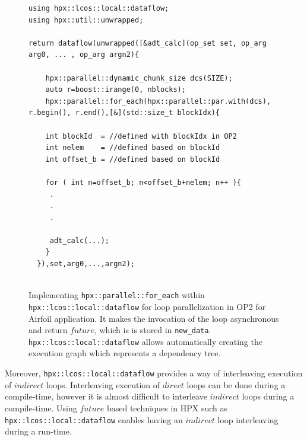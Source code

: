 \documentclass[conference]{IEEEtran}
\begin{document}
\begin{figure}
    \begin{lstlisting}    
using hpx::lcos::local::dataflow;
using hpx::util::unwrapped;    

return dataflow(unwrapped([&adt_calc](op_set set, op_arg arg0, ... , op_arg argn2){

    hpx::parallel::dynamic_chunk_size dcs(SIZE);
    auto r=boost::irange(0, nblocks);
    hpx::parallel::for_each(hpx::parallel::par.with(dcs), r.begin(), r.end(),[&](std::size_t blockIdx){
  
    int blockId  = //defined with blockIdx in OP2
    int nelem    = //defined based on blockId 
    int offset_b = //defined based on blockId
        
    for ( int n=offset_b; n<offset_b+nelem; n++ ){
     .
     .
     .

     adt_calc(...);
    }
  }),set,arg0,...,argn2);
  
    \end{lstlisting}
    \caption{\small{Implementing \texttt{hpx::parallel::for\_each} within \texttt{hpx::lcos::local::dataflow} for loop parallelization in OP2 for Airfoil application. It makes the invocation of the loop asynchronous and return $future$, which is is stored in \texttt{new\_data}. \texttt{hpx::lcos::local::dataflow} allows automatically creating the execution graph which represents a dependency tree.}}
    \label{l3b}
\end{figure}




Moreover, \texttt{hpx::lcos::local::dataflow} provides a way of interleaving execution of $indirect$ loops. Interleaving execution of $direct$ loops can be done during a compile-time, however it is almost difficult to interleave $indirect$ loops during a compile-time. Using $future$ based techniques in HPX such as \texttt{hpx::lcos::local::dataflow} enables having an $indirect$ loop interleaving during a run-time.  
\end{document}
